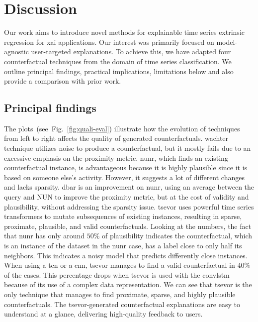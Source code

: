\section{Discussion}
\label{sec:discussion}


Our work aims to introduce novel methods for explainable time series extrinsic regression for \gls{xai} applications. Our interest was primarily focused on model-agnostic user-targeted explanations. To achieve this, we have adapted four counterfactual techniques from the domain of time series classification. We outline principal findings, practical implications, limitations below and also provide a comparison with prior work.



\subsection{Principal findings}
The plots~(see~Fig.~\ref{fig:quali-eval}) illustrate how the evolution of techniques from left to right affects the quality of generated counterfactuals. \gls{wachter} technique utilizes noise to produce a counterfactual, but it mostly fails due to an excessive emphasis on the proximity metric. \gls{nunr}, which finds an existing counterfactual instance, is advantageous because it is highly plausible since it is based on someone else's activity. However, it suggests a lot of different changes and lacks sparsity. \gls{dbar} is an improvement on \gls{nunr}, using an average between the query and NUN to improve the proximity metric, but at the cost of validity and plausibility, without addressing the sparsity issue. \gls{tsevor} uses powerful time series transformers to mutate subsequences of existing instances, resulting in sparse, proximate, plausible, and valid counterfactuals. 
Looking at the numbers, the fact that \gls{nunr} has only around $50\%$ of plausibility indicates the counterfactual, which is an instance of the dataset in the \gls{nunr} case, has a label close to only half its neighbors. This indicates a noisy model that predicts differently close instances. When using a \gls{tcn} or a \gls{cnn}, \gls{tsevor} manages to find a valid counterfactual in $40\%$ of the cases. This percentage drops when \gls{tsevor} is used with the \gls{convlstm} because of its use of a complex data representation. 
We can see that \gls{tsevor} is the only technique that manages to find proximate, sparse, and highly plausible counterfactuals.
The \gls{tsevor}-generated counterfactual explanations are easy to understand at a glance, delivering high-quality feedback to users.

